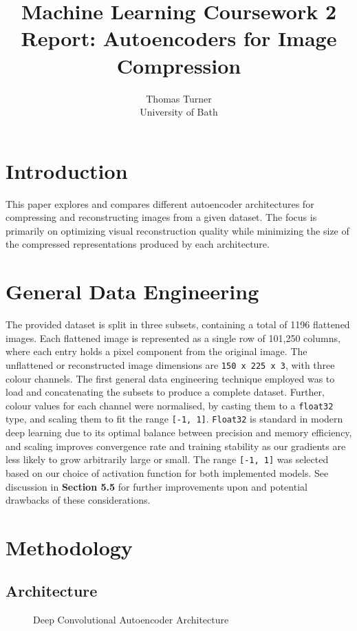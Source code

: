\documentclass[10pt,twocolumn,letterpaper]{article}
\title{Machine Learning Coursework 2 Report: Autoencoders for Image Compression}
\author{Thomas Turner \\
University of Bath \\
}
\date{}
\begin{document}
\maketitle

\section{Introduction}

This paper explores and compares different autoencoder architectures for compressing and reconstructing images from a given dataset. The focus is primarily on optimizing visual reconstruction quality while minimizing the size of the compressed representations produced by each architecture.


\section{General Data Engineering}
The provided dataset is split in three subsets, containing a total of 1196 flattened images. Each flattened image is represented as a single row of 101,250 columns, where each entry holds a pixel component from the original image. The unflattened or reconstructed image dimensions are \texttt{150 x 225 x 3}, with three colour channels.
The first general data engineering technique employed was to load and concatenating the subsets to produce a complete dataset. Further, colour values for each channel were normalised, by casting them to a \texttt{float32} type, and scaling them to fit the range \texttt{[-1, 1]}. \texttt{Float32} is standard in modern deep learning due to its optimal balance between precision and memory efficiency, and scaling improves convergence rate and training stability as our gradients are less likely to grow arbitrarily large or small. The range \texttt{[-1, 1]} was selected based on our choice of activation function for both implemented models. See discussion in \textbf{Section 5.5} for further improvements upon and potential drawbacks of these considerations.

\section{Methodology}


\subsection{Architecture}
\begin{figure}[ht]
    \centering
    \caption{Deep Convolutional Autoencoder Architecture}
    \label{fig:deep_convolutional_architecture}
\end{figure}
\end{document}
